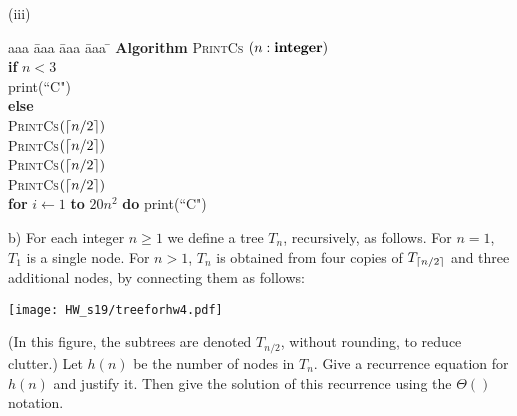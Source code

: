 \documentclass{article}
\begin{document}
\begin{problem}
\bigskip
\noindent
(iii)\ \ 
\begin{minipage}[t]{3in}
\begin{tabbing}
aaa \= aaa \= aaa \= aaa \=  \kill
\textbf{Algorithm} \textsc{PrintCs} $(n: \mbox{\bf integer})$ \\
          \> \textbf{if} $n < 3$ \\
          \>\>  print(``C") \\
          \>\textbf{else} \\
          \>\>  \textsc{PrintCs}$({\left\lceil n/2\right\rceil})$\\
          \>\>  \textsc{PrintCs}$({\left\lceil n/2\right\rceil})$\\
          \>\>  \textsc{PrintCs}$({\left\lceil n/2\right\rceil})$\\
          \>\>  \textsc{PrintCs}$({\left\lceil n/2\right\rceil})$\\
      \>\> \textbf{for} $i \leftarrow 1$ \textbf{to} $20n^2$ \textbf{do} print(``C")
\end{tabbing}
\end{minipage}

\bigskip
\noindent
b) For each integer $n \ge 1$ we define a tree $T_n$, recursively, as follows. For $n=1$, $T_1$ is
a single node. For $n > 1$, $T_n$ is obtained from four copies of $T_{{\left\lceil n/2\right\rceil}}$ and three
additional nodes, by connecting them as follows:
%
\begin{center}
\texttt{[image: HW\_s19/treeforhw4.pdf]}
\end{center}
%
(In this figure, the subtrees are denoted $T_{n/2}$, without rounding, to reduce clutter.)
Let $h(n)$ be the number of nodes in $T_n$. Give a recurrence equation for $h(n)$ and
justify it. Then give the solution of this recurrence  using the $\Theta()$ notation.
\end{problem}

\end{document}

